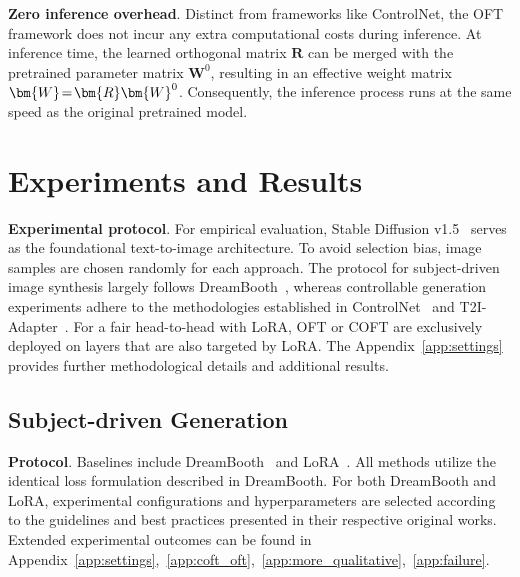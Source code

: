 \textbf{Zero inference overhead}. Distinct from frameworks like ControlNet, the OFT framework does not incur any extra computational costs during inference. At inference time, the learned orthogonal matrix $\bm{R}$ can be merged with the pretrained parameter matrix $\bm{W}^0$, resulting in an effective weight matrix $\thickmuskip=2mu \medmuskip=2mu \bm{W}=\bm{R}\bm{W}^0$. Consequently, the inference process runs at the same speed as the original pretrained model.

\section{Experiments and Results}

\textbf{Experimental protocol}. For empirical evaluation, Stable Diffusion v1.5~\cite{rombach2022high} serves as the foundational text-to-image architecture. To avoid selection bias, image samples are chosen randomly for each approach. The protocol for subject-driven image synthesis largely follows DreamBooth~\cite{ruiz2023dreambooth}, whereas controllable generation experiments adhere to the methodologies established in ControlNet~\cite{zhang2023adding} and T2I-Adapter~\cite{mou2023t2i}. For a fair head-to-head with LoRA, OFT or COFT are exclusively deployed on layers that are also targeted by LoRA. The Appendix~\ref{app:settings} provides further methodological details and additional results.

\subsection{Subject-driven Generation}

\textbf{Protocol}. Baselines include DreamBooth~\cite{ruiz2023dreambooth} and LoRA~\cite{hulora2022}. All methods utilize the identical loss formulation described in DreamBooth. For both DreamBooth and LoRA, experimental configurations and hyperparameters are selected according to the guidelines and best practices presented in their respective original works. Extended experimental outcomes can be found in Appendix~\ref{app:settings},~\ref{app:coft_oft},~\ref{app:more_qualitative},~\ref{app:failure}.

